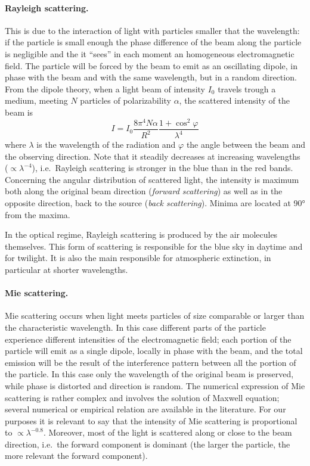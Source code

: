 \paragraph{Rayleigh scattering.} This is due to the interaction of light with particles smaller that the wavelength: if the particle is small enough the phase difference of the beam along the particle is negligible and the it ``sees'' in each moment an homogeneous electromagnetic field. The particle will be forced by the beam to emit as an oscillating dipole, in phase with the beam and with the same wavelength, but in a random direction. From the dipole theory, when a light beam of intensity $I_0$ travels trough a medium, meeting $N$ particles of polarizability $\alpha$, the scattered intensity of the beam is
\begin{equation}
	I = I_0 \frac{8\pi^4 N\alpha}{R^2} \frac{1+\cos^2\varphi}{\lambda^4}
\end{equation}
where $\lambda$ is the wavelength of the radiation and $\varphi$ the angle between the beam and the observing direction. Note that it steadily decreases at increasing wavelengths ($\propto\lambda^{-4}$), i.e.\ Rayleigh scattering is stronger in the blue than in the red bands. Concerning the angular distribution of scattered light, the intensity is maximum both along the original beam direction (\emph{forward scattering}) as well as in the opposite direction, back to the source (\emph{back scattering}). Minima are located at \ang{90} from the maxima.

In the optical regime, Rayleigh scattering is produced by the air molecules themselves. This form of scattering is responsible for the blue sky in daytime and for twilight. It is also the main responsible for atmospheric extinction, in particular at shorter wavelengths.

\paragraph{Mie scattering.} Mie scattering occurs when light meets particles of size comparable or larger than the characteristic wavelength. In this case different parts of the particle experience different intensities of the electromagnetic field; each portion of the particle will emit as a single dipole, locally in phase with the beam, and the total emission will be the result of the interference pattern between all the portion of the particle. In this case only the wavelength of the original beam is preserved, while phase is distorted and direction is random. The numerical expression of Mie scattering is rather complex and involves the solution of Maxwell equation; several numerical or empirical relation are available in the literature. For our purposes it is relevant to say that the intensity of Mie scattering is proportional to $\propto\lambda^{-0.8}$. Moreover, most of the light is scattered along or close to the beam direction, i.e.\ the forward component is dominant (the larger the particle, the more relevant the forward component).

